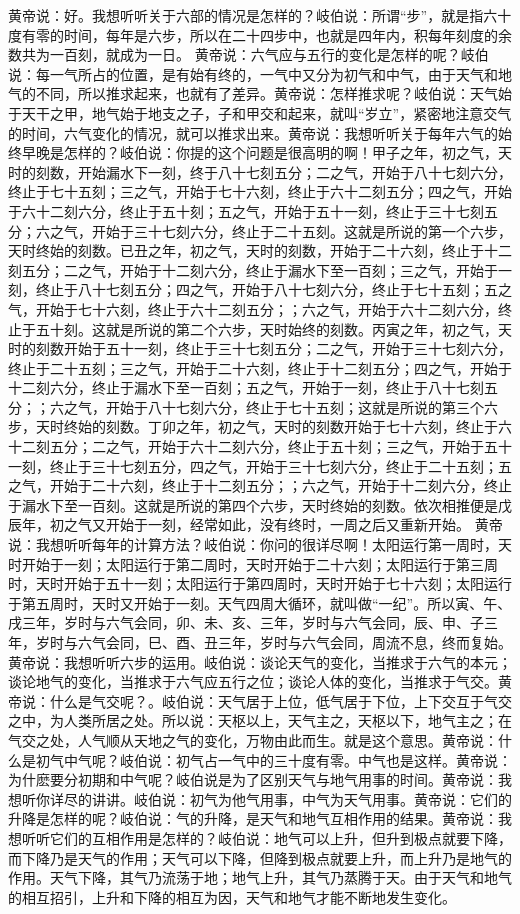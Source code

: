 \documentclass[12pt,UTF8]{ctexbook}
\begin{document}
黄帝说：好。我想听听关于六部的情况是怎样的？岐伯说：所谓“步”，就是指六十度有零的时间，每年是六步，所以在二十四步中，也就是四年内，积每年刻度的余数共为一百刻，就成为一日。
黄帝说：六气应与五行的变化是怎样的呢？岐伯说：每一气所占的位置，是有始有终的，一气中又分为初气和中气，由于天气和地气的不同，所以推求起来，也就有了差异。黄帝说：怎样推求呢？岐伯说：天气始于天干之甲，地气始于地支之子，子和甲交和起来，就叫“岁立”，紧密地注意交气的时间，六气变化的情况，就可以推求出来。黄帝说：我想听听关于每年六气的始终早晚是怎样的？岐伯说：你提的这个问题是很高明的啊！甲子之年，初之气，天时的刻数，开始漏水下一刻，终于八十七刻五分；二之气，开始于八十七刻六分，终止于七十五刻；三之气，开始于七十六刻，终止于六十二刻五分；四之气，开始于六十二刻六分，终止于五十刻；五之气，开始于五十一刻，终止于三十七刻五分；六之气，开始于三十七刻六分，终止于二十五刻。这就是所说的第一个六步，天时终始的刻数。已丑之年，初之气，天时的刻数，开始于二十六刻，终止于十二刻五分；二之气，开始于十二刻六分，终止于漏水下至一百刻；三之气，开始于一刻，终止于八十七刻五分；四之气，开始于八十七刻六分，终止于七十五刻；五之气，开始于七十六刻，终止于六十二刻五分；；六之气，开始于六十二刻六分，终止于五十刻。这就是所说的第二个六步，天时始终的刻数。丙寅之年，初之气，天时的刻数开始于五十一刻，终止于三十七刻五分；二之气，开始于三十七刻六分，终止于二十五刻；三之气，开始于二十六刻，终止于十二刻五分；四之气，开始于十二刻六分，终止于漏水下至一百刻；五之气，开始于一刻，终止于八十七刻五分；；六之气，开始于八十七刻六分，终止于七十五刻；这就是所说的第三个六步，天时终始的刻数。丁卯之年，初之气，天时的刻数开始于七十六刻，终止于六十二刻五分；二之气，开始于六十二刻六分，终止于五十刻；三之气，开始于五十一刻，终止于三十七刻五分，四之气，开始于三十七刻六分，终止于二十五刻；五之气，开始于二十六刻，终止于十二刻五分；；六之气，开始于十二刻六分，终止于漏水下至一百刻。这就是所说的第四个六步，天时终始的刻数。依次相推便是戊辰年，初之气又开始于一刻，经常如此，没有终时，一周之后又重新开始。
黄帝说：我想听听每年的计算方法？岐伯说：你问的很详尽啊！太阳运行第一周时，天时开始于一刻；太阳运行于第二周时，天时开始于二十六刻；太阳运行于第三周时，天时开始于五十一刻；太阳运行于第四周时，天时开始于七十六刻；太阳运行于第五周时，天时又开始于一刻。天气四周大循环，就叫做“一纪”。所以寅、午、戌三年，岁时与六气会同，卯、未、亥、三年，岁时与六气会同，辰、申、子三年，岁时与六气会同，巳、酉、丑三年，岁时与六气会同，周流不息，终而复始。
黄帝说：我想听听六步的运用。岐伯说：谈论天气的变化，当推求于六气的本元；谈论地气的变化，当推求于六气应五行之位；谈论人体的变化，当推求于气交。黄帝说：什么是气交呢？。岐伯说：天气居于上位，低气居于下位，上下交互于气交之中，为人类所居之处。所以说：天枢以上，天气主之，天枢以下，地气主之；在气交之处，人气顺从天地之气的变化，万物由此而生。就是这个意思。黄帝说：什么是初气中气呢？岐伯说：初气占一气中的三十度有零。中气也是这样。黄帝说：为什麽要分初期和中气呢？岐伯说是为了区别天气与地气用事的时间。黄帝说：我想听你详尽的讲讲。岐伯说：初气为他气用事，中气为天气用事。黄帝说：它们的升降是怎样的呢？岐伯说：气的升降，是天气和地气互相作用的结果。黄帝说：我想听听它们的互相作用是怎样的？岐伯说：地气可以上升，但升到极点就要下降，而下降乃是天气的作用；天气可以下降，但降到极点就要上升，而上升乃是地气的作用。天气下降，其气乃流荡于地；地气上升，其气乃蒸腾于天。由于天气和地气的相互招引，上升和下降的相互为因，天气和地气才能不断地发生变化。
\end{document}
